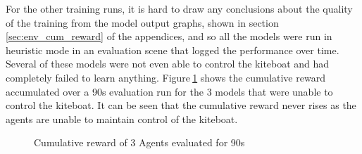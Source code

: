 For the other training runs, it is hard to draw any conclusions about the quality of the training from the model output graphs, shown in section$~$\ref{sec:env_cum_reward} of the appendices, and so all the models were run in heuristic mode in an evaluation scene that logged the performance over time. Several of these models were not even able to control the kiteboat and had completely failed to learn anything. Figure$~$\ref{bad_runs} shows the cumulative reward accumulated over a 90s evaluation run for the 3 models that were unable to control the kiteboat. It can be seen that the cumulative reward never rises as the agents are unable to maintain control of the kiteboat.

\begin{figure}[!htb]
    \centering
    \caption{Cumulative reward of 3 Agents evaluated for 90s}\label{bad_runs}
\end{figure}

